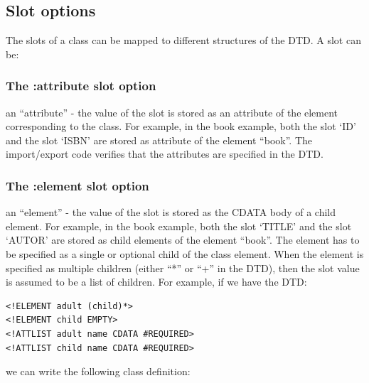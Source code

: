 \subsection{ Slot options}

The slots of a class can be mapped to different structures of the
DTD. A slot can be:



\subsubsection{ The :attribute slot option}

an ``attribute'' - the value of the slot is stored as an attribute
of the element corresponding to the class. For example, in the
book example, both the slot `ID' and the slot `ISBN' are stored as
attribute of the element ``book''. The import/export code verifies
that the attributes are specified in the DTD.



\subsubsection{ The :element slot option}

an ``element'' - the value of the slot is stored as the CDATA body
of a child element. For example, in the book example, both the
slot `TITLE' and the slot `AUTOR' are stored as child elements of
the element ``book''. The element has to be specified as a single or
optional child of the class element. When the element is specified
as multiple children (either ``*'' or ``+'' in the DTD), then the slot
value is assumed to be a list of children. For example, if we have
the DTD:

\begin{Verbatim}[fontsize=\small,frame=leftline,framerule=0.9mm,rulecolor=\color{gray},framesep=5.1mm,xleftmargin=5mm,fontfamily=cmtt]
<!ELEMENT adult (child)*>
<!ELEMENT child EMPTY>
<!ATTLIST adult name CDATA #REQUIRED>
<!ATTLIST child name CDATA #REQUIRED>
\end{Verbatim}
we can write the following class definition:

